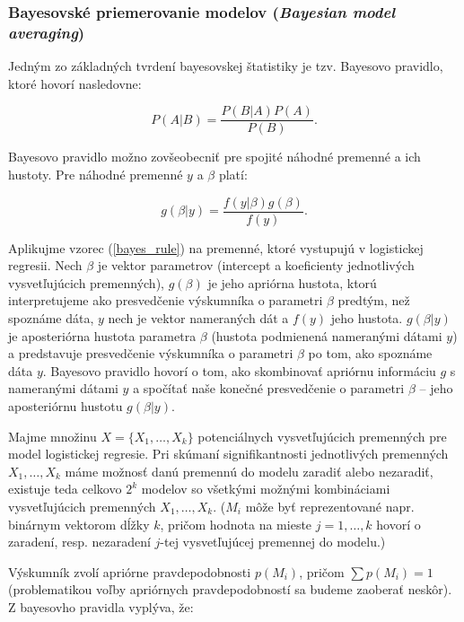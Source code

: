 \subsubsection{Bayesovské priemerovanie modelov (\emph{Bayesian model averaging})}

Jedným zo základných tvrdení bayesovskej štatistiky je tzv. Bayesovo pravidlo, ktoré hovorí nasledovne:

\[
P(A|B) = \frac{P(B|A) P(A)}{P(B)}.
\]

Bayesovo pravidlo možno zovšeobecniť pre spojité náhodné premenné a ich hustoty. Pre náhodné premenné \(y\) a \( \beta \) platí:

\begin{equation} \label{bayes_rule}
    g(\beta | y) = \frac{f(y | \beta) g(\beta)}{f(y)}.
\end{equation}

Aplikujme vzorec (\ref{bayes_rule}) na premenné, ktoré vystupujú v logistickej regresii.
Nech \( \beta \) je vektor parametrov (intercept a koeficienty jednotlivých vysvetľujúcich premenných),
\( g(\beta) \) je jeho apriórna hustota, ktorú interpretujeme ako presvedčenie výskumníka o parametri \( \beta \) predtým, než spoznáme dáta,
\( y \) nech je vektor nameraných dát a \( f(y) \) jeho hustota.
\( g(\beta | y) \) je aposteriórna hustota parametra \( \beta \) (hustota podmienená nameranými dátami \( y \)) a predstavuje presvedčenie výskumníka o parametri \( \beta \) po tom, ako spoznáme dáta \( y \).
Bayesovo pravidlo hovorí o tom, ako skombinovať apriórnu informáciu \( g \) s nameranými dátami \( y \) a spočítať naše konečné presvedčenie o parametri \( \beta \) – jeho aposteriórnu hustotu \( g(\beta|y) \).

Majme množinu \( X = \{X_1, \ldots,  X_k\} \) potenciálnych vysvetľujúcich premenných pre model logistickej regresie.
Pri skúmaní signifikantnosti jednotlivých premenných \( X_1, \ldots, X_k \) máme možnosť danú premennú do modelu zaradiť alebo nezaradiť,
existuje teda celkovo \( 2^k \) modelov so všetkými možnými kombináciami vysvetľujúcich premenných \( X_1, \ldots, X_k \).
(\( M_i \) môže byť reprezentované napr. binárnym vektorom dĺžky \(k\), pričom hodnota na mieste \( j = 1, \ldots, k \) hovorí o zaradení, resp. nezaradení \(j\)-tej vysvetľujúcej premennej do modelu.)

Výskumník zvolí apriórne pravdepodobnosti \( p(M_i) \), pričom \( \sum p(M_i) = 1 \) (problematikou voľby apriórnych pravdepodobností sa budeme zaoberať neskôr).
Z bayesovho pravidla vyplýva, že:

